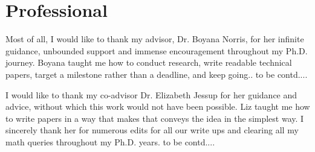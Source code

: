 \setcounter{tocdepth}{-10}
\section*{Professional}
Most of all, I would like to thank my advisor, Dr. Boyana Norris, for her infinite guidance, unbounded support and immense encouragement throughout my Ph.D. journey. Boyana taught me how to conduct research, write readable technical papers, target a milestone rather than a deadline, and keep going.. {to be contd....} 


I would like to thank my co-advisor Dr. Elizabeth Jessup for her guidance and advice, without which this work would not have been possible. Liz taught me how to write papers in a way that makes that conveys the idea in the simplest way. I sincerely thank her for numerous edits for all our write ups and clearing all my math queries throughout my Ph.D. years. {to be contd....} 

\par

\setcounter{tocdepth}{3}
